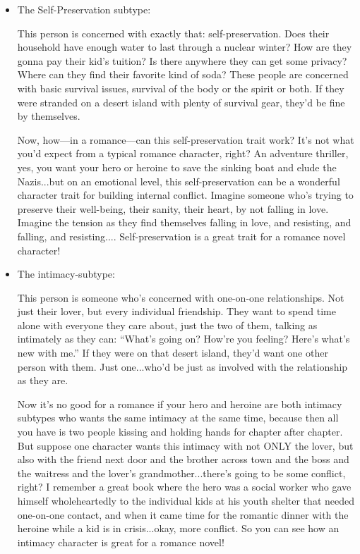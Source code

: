 \documentclass[openleft,oneside,showtrims]{memoir}
\begin{document}
\begin{itemize}
\item The Self-Preservation subtype:
\label{sec:org12bbb94}

This person is concerned with exactly that: self-preservation. Does their household have enough water to last through a nuclear winter? How are they gonna pay their kid's tuition? Is there anywhere they can get some privacy? Where can they find their favorite kind of soda? These people are concerned with basic survival issues, survival of the body or the spirit or both. If they were stranded on a desert island with plenty of survival gear, they'd be fine by themselves.

Now, how—in a romance—can this self-preservation trait work? It's not what you'd expect from a typical romance character, right? An adventure thriller, yes, you want your hero or heroine to save the sinking boat and elude the Nazis...but on an emotional level, this self-preservation can be a wonderful character trait for building internal conflict. Imagine someone who's trying to preserve their well-being, their sanity, their heart, by not falling in love. Imagine the tension as they find themselves falling in love, and resisting, and falling, and resisting.... Self-preservation is a great trait for a romance novel character!

\item The intimacy-subtype:
\label{sec:org57ea9fc}

This person is someone who's concerned with one-on-one relationships. Not just their lover, but every individual friendship. They want to spend time alone with everyone they care about, just the two of them, talking as intimately as they can: ``What's going on? How're you feeling? Here's what's new with me.'' If they were on that desert island, they'd want one other person with them. Just one...who'd be just as involved with the relationship as they are.

Now it's no good for a romance if your hero and heroine are both intimacy subtypes who wants the same intimacy at the same time, because then all you have is two people kissing and holding hands for chapter after chapter. But suppose one character wants this intimacy with not ONLY the lover, but also with the friend next door and the brother across town and the boss and the waitress and the lover's grandmother...there's going to be some conflict, right? I remember a great book where the hero was a social worker who gave himself wholeheartedly to the individual kids at his youth shelter that needed one-on-one contact, and when it came time for the romantic dinner with the heroine while a kid is in crisis...okay, more conflict. So you can see how an intimacy character is great for a romance novel!


\end{itemize}
\end{document}
